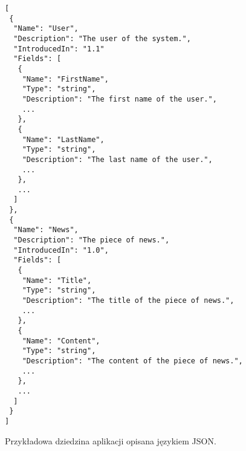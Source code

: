 \begin{figure}[!ht]
\begin{verbatim}
[
 {
  "Name": "User",
  "Description": "The user of the system.",
  "IntroducedIn": "1.1"
  "Fields": [
   {
    "Name": "FirstName",
    "Type": "string",
    "Description": "The first name of the user.",
    ...
   },
   {
    "Name": "LastName",
    "Type": "string",
    "Description": "The last name of the user.",
    ...
   },
   ...
  ]
 },
 {
  "Name": "News",
  "Description": "The piece of news.",
  "IntroducedIn": "1.0",
  "Fields": [
   {
    "Name": "Title",
    "Type": "string",
    "Description": "The title of the piece of news.",
    ...
   },
   {
    "Name": "Content",
    "Type": "string",
    "Description": "The content of the piece of news.",
    ...
   },
   ...
  ]
 }
]
\end{verbatim}

\caption{Przykładowa dziedzina aplikacji opisana językiem JSON.}
\label{fig:implementation_core:json}
\end{figure}
